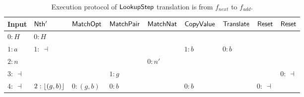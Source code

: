 \begin{table}[t]
  \centering
  \scriptsize
  \begin{tabular}{l||l|l|l|l|l|l|l|l}
    Input       & $\mathsf{Nth'}$      & $\mathsf{MatchOpt}$       & $\mathsf{MatchPair}$     & $\mathsf{MatchNat}$ & $\mathsf{CopyValue}$  & $\mathsf{Translate}$ & $\mathsf{Reset}$ & $\mathsf{Reset}$ \\ \hline
    $0:H$       & $0:H$            &                       &                      &                 &                   &                  &              &              \\
    $1:a$       & $1:~\dashv$      &                       &                      &                 & $1:b$             & $0:b$            &              &              \\
    $2:n$       &                  &                       &                      & $0:n'$          &                   &                  &              &              \\
    $3:~\dashv$ &                  &                       & $1: g$               &                 &                   &                  &              & $0:~\dashv$  \\
    $4:~\dashv$ & $2:\left\lfloor {(g,b)} \right\rfloor$ & $0:(g,b)$             & $0:b$                &                 & $0:b$             &                  & $0:~\dashv$  &              \\
  \end{tabular}
  \caption{Execution protocol of $\mathsf{LookupStep}$ %
    translation is from $f_{next}$ to $f_{add}$.}
  \label{tab:exec-LookupStep-S}
\end{table}
